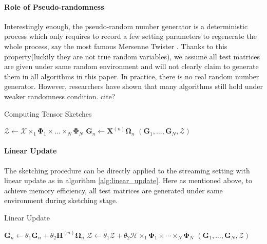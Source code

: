 \paragraph{Role of Pseudo-randomness} Interestingly enough, the pseudo-random number generator is a deterministic process which only requires to record a few setting parameters to regenerate the whole process, say the most famous Mersenne Twister \citep{matsumoto1998mersenne}. Thanks to this property(luckily they are not true random variables), we assume all test matrices are given under same random environment and will not clearly claim to generate them in all algorithms in this paper. In practice, there is no real random number generator. However, researchers have shown that many algorithms still hold under weaker randomness condition. cite?

\begin{algorithm}[ht]
\caption{Computing Tensor Sketches}\label{alg:tensor_sketch}
  \begin{algorithmic}[1]
  \State $\mathscr{Z} \leftarrow \mathscr{X}\times_1 \mathbf{\Phi}_1 \times \dots \times_N  \mathbf{\Phi}_N $
  \State $\mathbf{G}_n\leftarrow \mathbf{X}^{(n)}\mathbf{\Omega}_n $ 
  \EndFor 
  \State \Return $(\mathbf{G}_1,\dots,\mathbf{G}_N,\mathscr{Z})$
  \EndFunction
\end{algorithmic}
\end{algorithm}

\paragraph{Linear Update} 
The sketching procedure can be directly applied to the streaming setting with linear update as in algorithm \ref{alg:linear_update}. Here as mentioned above, to achieve memory efficiency, all test matrices are generated under same environment during sketching stage. 
\begin{algorithm}[ht]
\caption{Linear Update}\label{alg:linear_update}
  \begin{algorithmic}[1]
  \State $\mathbf{G}_n \leftarrow \theta_1 \mathbf{G}_n + \theta_2 \mathbf{H}^{(n)} \mathbf{\Omega}_n $ 
  \EndFor
  \State $\mathscr{Z} \leftarrow \theta_1 \mathscr{Z} + \theta_2 \mathscr{H} \times_1 \mathbf{\Phi}_1 \times \cdots \times_N \mathbf{\Phi}_N $
  \State \Return $(\mathbf{G}_1, \dots, \mathbf{G}_N, \mathscr{Z})$
  \EndFunction
\end{algorithmic}
\end{algorithm}


